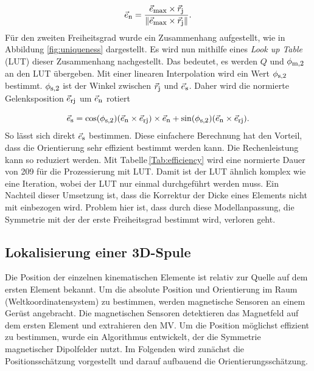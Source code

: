     \begin{equation}
        \vec{e}_{\textrm{\footnotesize{n}}} = \frac{\vec{e}_{\textrm{\footnotesize{max}}} \times \vec{r}_{\textrm{\footnotesize{j}}}}{\|\vec{e}_{\textrm{\footnotesize{max}}} \times \vec{r}_{\textrm{\footnotesize{j}}}\|}.
    \end{equation}
Für den zweiten Freiheitsgrad wurde ein Zusammenhang aufgestellt, wie in Abbildung \ref{fig:uniqueness} dargestellt. Es wird nun mithilfe eines \textit{Look up Table} (LUT)  dieser Zusammenhang nachgestellt. Das bedeutet, es werden $Q$ und $\phi_{\textrm{\footnotesize{m,2}}}$ an den LUT übergeben. Mit einer linearen Interpolation wird ein Wert $\phi_{\textrm{\footnotesize{s,2}}}$ bestimmt. $\phi_{\textrm{\footnotesize{s,2}}}$ ist der Winkel zwischen $\vec{r}_{\textrm{\footnotesize{j}}}$ und $\vec{e}_{\textrm{\footnotesize{s}}}$. Daher wird die normierte Gelenksposition $\vec{e}_{\textrm{\footnotesize{rj}}}$ um $\vec{e}_{\textrm{\footnotesize{n}}}$ rotiert

    \begin{equation}
        \vec{e}_{\textrm{\footnotesize{s}}} = \cos(\phi_{\textrm{\footnotesize{s,2}}})(\vec{e}_{\textrm{\footnotesize{n}}} \times \vec{e}_{\textrm{\footnotesize{rj}}})\times \vec{e}_{\textrm{\footnotesize{n}}} + \sin(\phi_{\textrm{\footnotesize{s,2}}}) (\vec{e}_{\textrm{\footnotesize{n}}} \times\vec{e}_{\textrm{\footnotesize{rj}}}).
    \end{equation}
So lässt sich direkt $\vec{e}_{\textrm{\footnotesize{s}}}$ bestimmen. Diese einfachere Berechnung hat den Vorteil,  dass die Orientierung sehr effizient bestimmt werden kann. Die Rechenleistung kann so reduziert werden. Mit Tabelle\,\ref{Tab:efficiency} wird eine normierte Dauer von 209 für die Prozessierung mit LUT. Damit ist der LUT ähnlich komplex wie eine Iteration, wobei der LUT nur einmal durchgeführt werden muss. Ein Nachteil dieser Umsetzung ist, dass die Korrektur der Dicke eines Elements nicht mit einbezogen wird. Problem hier ist, dass durch diese Modellanpassung, die Symmetrie mit der der erste Freiheitsgrad bestimmt wird, verloren geht.

\subsection{Lokalisierung einer 3D-Spule}
	
Die Position der einzelnen kinematischen Elemente ist relativ zur Quelle auf dem ersten Element bekannt. Um die absolute Position und Orientierung im Raum (Weltkoordinatensystem) zu bestimmen, werden magnetische Sensoren an einem Gerüst angebracht. Die magnetischen Sensoren detektieren das Magnetfeld auf dem ersten Element und extrahieren den MV. Um die Position möglichst effizient zu bestimmen, wurde ein Algorithmus entwickelt, der die Symmetrie magnetischer Dipolfelder nutzt. Im Folgenden wird zunächst die Positionsschätzung vorgestellt und darauf aufbauend die Orientierungsschätzung.
	
